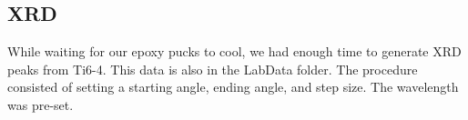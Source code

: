 \documentclass{article}
\begin{document}
\subsection{XRD}
While waiting for our epoxy pucks to cool, we had enough time to generate XRD peaks from Ti6-4. This data is also in the LabData folder. The procedure consisted of setting a starting angle, ending angle, and step size. The wavelength was pre-set.
\end{document}
